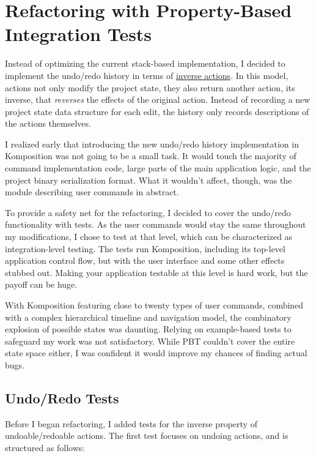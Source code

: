 \section{Refactoring with Property-Based Integration Tests}


Instead of optimizing the current stack-based implementation, I decided to implement the undo/redo history in terms of \href{https://en.wikipedia.org/wiki/Inverse_function}{inverse actions}. In this model, actions not only modify the project state, they also return another action, its inverse, that \textit{reverses} the effects of the original action. Instead of recording a new project state data structure for each edit, the history only records descriptions of the actions themselves.

I realized early that introducing the new undo/redo history implementation in Komposition was not going to be a small task. It would touch the majority of command implementation code, large parts of the main application logic, and the project binary serialization format. What it wouldn't affect, though, was the module describing user commands in abstract.

To provide a safety net for the refactoring, I decided to cover the undo/redo functionality with tests. As the user commands would stay the same throughout my modifications, I chose to test at that level, which can be characterized as integration-level testing. The tests run Komposition, including its top-level application control flow, but with the user interface and some other effects stubbed out. Making your application testable at this level is hard work, but the payoff can be huge.

With Komposition featuring close to twenty types of user commands, combined with a complex hierarchical timeline and navigation model, the combinatory explosion of possible states was daunting. Relying on example-based tests to safeguard my work was not satisfactory. While PBT couldn't cover the entire state space either, I was confident it would improve my chances of finding actual bugs.


\subsection{Undo/Redo Tests}


Before I began refactoring, I added tests for the inverse property of undoable/redoable actions. The first test focuses on undoing actions, and is structured as follows:


